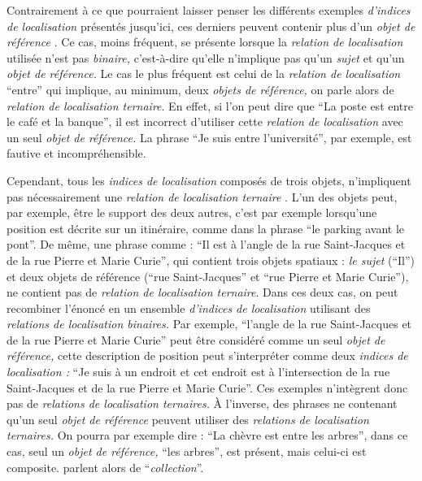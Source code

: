 Contrairement à ce que pourraient laisser penser les différents
exemples \emph{d'indices de localisation} présentés jusqu'ici, ces
derniers peuvent contenir plus d'un \emph{objet de référence}
\autocite{Clementini2013}. Ce cas, moins fréquent, se présente lorsque
la \emph{relation de localisation} utilisée n'est pas \emph{binaire,}
c'est-à-dire qu'elle n'implique pas qu'un \emph{sujet} et qu'un
\emph{objet de référence.} Le cas le plus fréquent est celui de la
\emph{relation de localisation} \enquote{entre} qui implique, au
minimum, deux \emph{objets de référence,} on parle alors de
\emph{relation de localisation ternaire}. En effet, si l'on peut dire
que \enquote{La poste est entre le café et la banque}, il est
incorrect d'utiliser cette \emph{relation de localisation} avec un
seul \emph{objet de référence.} La phrase \enquote{Je suis entre
  l'université}, par exemple, est fautive et incompréhensible.

Cependant, tous les \emph{indices de localisation} composés de trois
objets, n'impliquent pas nécessairement une \emph{relation de
  localisation ternaire} \autocite{Duchene2019}. L'un des objets peut,
par exemple, être le support des deux autres, c'est par exemple
lorsqu'une position est décrite sur un itinéraire, comme dans la
phrase \enquote{le parking avant le pont}. De même, une phrase comme :
\enquote{Il est à l'angle de la rue Saint-Jacques et de la rue Pierre
  et Marie Curie}, qui contient trois objets spatiaux : \emph{le
  sujet} (\enquote{Il}) et deux objets de référence (\enquote{rue
  Saint-Jacques} et \enquote{rue Pierre et Marie Curie}), ne contient
pas de \emph{relation de localisation ternaire}. Dans ces deux cas, on
peut recombiner l'énoncé en un ensemble \emph{d'indices de
  localisation} utilisant des \emph{relations de localisation
  binaires.} Par exemple, \enquote{l'angle de la rue Saint-Jacques et
  de la rue Pierre et Marie Curie} peut être considéré comme un seul
\emph{objet de référence,} cette description de position peut
s'interpréter comme deux \emph{indices de localisation :} \enquote{Je
  suis à un endroit et cet endroit est à l'intersection de la rue
  Saint-Jacques et de la rue Pierre et Marie Curie}. Ces exemples
n’intègrent donc pas de \emph{relations de localisation ternaires.} À
l'inverse, des phrases ne contenant qu'un seul \emph{objet de
  référence} peuvent utiliser des \emph{relations de localisation
  ternaires.} On pourra par exemple dire : \enquote{La chèvre est
  entre les arbres}, dans ce cas, seul un \emph{objet de référence,}
\enquote{les arbres}, est présent, mais celui-ci est composite.
\textcite{Aurnague1993} parlent alors de \enquote{\emph{collection}}.



